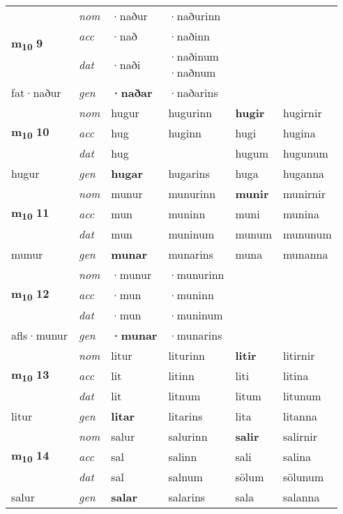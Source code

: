 \begin{longtable}[l]{X>{\footnotesize\itshape}XXXXX}
\multirow{3}{*}{{{\textbf{m{\textsubscript{10}}} \Large{\textbf{9}}}}} & nom & ·naður & ·naðurinn & \textbf{} &  \\*
 & acc & ·nað & ·naðinn &  &  \\*
 & dat & ·naði & \specialcell{·naðinum\\  ·naðnum} &  &  \\*
 {\footnotesize{fat\allowbreak ·naður}} & gen & \textbf{·naðar} & ·naðarins &  &  \\
\midrule

\multirow{3}{*}{{{\textbf{m{\textsubscript{10}}} \Large{\textbf{10}}}}} & nom & hugur & hugurinn & \textbf{hugir} & hugirnir \\*
 & acc & hug & huginn & hugi & hugina \\*
 & dat & hug &  & hugum & hugunum \\*
 {\footnotesize{hugur}} & gen & \textbf{hugar} & hugarins & huga & huganna \\
\midrule

\multirow{3}{*}{{{\textbf{m{\textsubscript{10}}} \Large{\textbf{11}}}}} & nom & munur & munurinn & \textbf{munir} & munirnir \\*
 & acc & mun & muninn & muni & munina \\*
 & dat & mun & muninum & munum & mununum \\*
 {\footnotesize{munur}} & gen & \textbf{munar} & munarins & muna & munanna \\
\midrule

\multirow{3}{*}{{{\textbf{m{\textsubscript{10}}} \Large{\textbf{12}}}}} & nom & ·munur & ·munurinn & \textbf{} &  \\*
 & acc & ·mun & ·muninn &  &  \\*
 & dat & ·mun & ·muninum &  &  \\*
 {\footnotesize{afls\allowbreak ·munur}} & gen & \textbf{·munar} & ·munarins &  &  \\
\midrule

\multirow{3}{*}{{{\textbf{m{\textsubscript{10}}} \Large{\textbf{13}}}}} & nom & litur & liturinn & \textbf{litir} & litirnir \\*
 & acc & lit & litinn & liti & litina \\*
 & dat & lit & litnum & litum & litunum \\*
 {\footnotesize{litur}} & gen & \textbf{litar} & litarins & lita & litanna \\
\midrule

\multirow{3}{*}{{{\textbf{m{\textsubscript{10}}} \Large{\textbf{14}}}}} & nom & salur & salurinn & \textbf{salir} & salirnir \\*
 & acc & sal & salinn & sali & salina \\*
 & dat & sal & salnum & sölum & sölunum \\*
 {\footnotesize{salur}} & gen & \textbf{salar} & salarins & sala & salanna \\
\midrule


\end{longtable}

